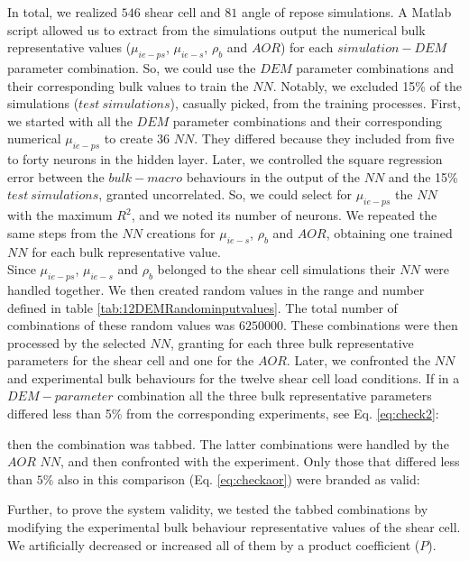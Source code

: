 In total, we realized $546$ shear cell and $81$ angle of repose simulations.
A Matlab script allowed us to extract from the simulations output the numerical
bulk representative values ($\mu_{ie-ps}$, $\mu_{ie-s}$, $\rho_b$ and $AOR$) for each $simulation-DEM$ parameter combination. 
So, we could use the $DEM$ parameter combinations and their corresponding bulk values to train the $NN$. 
Notably, we excluded 15\% of the simulations ($test ~ simulations$), casually
picked, from the training processes.
First, we started with all the $DEM$ parameter combinations and their corresponding numerical $\mu_{ie-ps}$ to create 36 $NN$. 
They differed because they included from five to forty neurons in the hidden
layer.
Later, we controlled the square regression error between the $bulk-macro$ behaviours in the output of 
the $NN$ and the 15\% $test ~ simulations$, granted uncorrelated. 
So, we could select for $\mu_{ie-ps}$ the $NN$ with the maximum $R^2$, and we noted its number of neurons. 
We repeated the same steps from the $NN$ creations for $\mu_{ie-s}$, $\rho_b$ and $AOR$, 
obtaining one trained $NN$ for each bulk representative value. \\
% 
Since $\mu_{ie-ps}$, $\mu_{ie-s}$ and $\rho_b$ belonged to the shear cell
simulations their $NN$ were handled together. We then created random values in the range
and number defined in table \ref{tab:12DEMRandominputvalues}.
The total number of combinations of these random values was $6250000$. These
combinations were then processed by the selected $NN$, granting for each three bulk representative parameters for the shear cell and one for the $AOR$. Later, we confronted the $NN$ and experimental bulk behaviours for the twelve shear cell load conditions. 
If in a $DEM-parameter$ combination all the three bulk representative parameters differed less 
than 5\% from the corresponding experiments, see Eq. \ref{eq:check2}:

then the combination was tabbed. The latter combinations were handled by the $AOR$ $NN$, and then confronted with the experiment. 
Only those that differed less than $5\%$ also in this comparison (Eq.
\ref{eq:checkaor}) were branded as valid:

Further, to prove the system validity, we tested the tabbed combinations by modifying the experimental bulk
behaviour representative values of the shear cell. 
We artificially decreased or increased all of them by a product coefficient ($P$).





